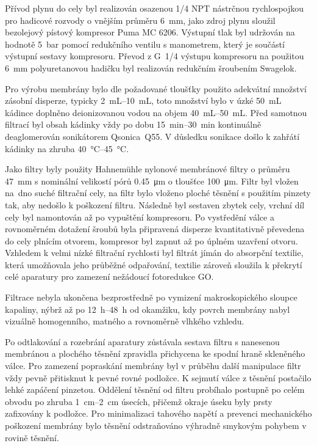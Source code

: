 Přívod plynu do cely byl realizován osazenou \qty[parse-numbers = false]{1/4}{\inchp} NPT nástrčnou rychlospojkou pro hadicové rozvody o vnějším průměru \qty{6}{\milli\meter}, jako zdroj plynu sloužil bezolejový pístový kompresor Puma MC 6206. Výstupní tlak byl udržován na hodnotě \qty{5}{\bar} pomocí redukčního ventilu s manometrem, který je součástí výstupní sestavy kompresoru. Převod z G~\qty[parse-numbers = false]{1/4}{\inchp} výstupu kompresoru na použitou \qty{6}{\milli\meter} polyuretanovou hadičku byl realizován redukčním šroubením Swagelok.

Pro výrobu membrány bylo dle požadované tloušťky použito adekvátní množství zásobní disperze, typicky \qtyrange{2}{10}{\milli\liter}, toto množství bylo v úzké \qty{50}{\milli\liter} kádince doplněno deionizovanou vodou na objem \qtyrange{40}{50}{\milli\liter}. Před samotnou filtrací byl obsah kádinky vždy po dobu \qtyrange{15}{30}{\minute} kontinuálně deaglomerován sonikátorem Qsonica~Q55. V důsledku sonikace došlo k zahřátí kádinky na zhruba \qtyrange{40}{45}{\celsius}.

Jako filtry byly použity Hahnemühle nylonové membránové filtry o průměru \qty{47}{\milli\meter} s nominální velikostí pórů \qty{0.45}{\micro\meter} o tloušťce \qty{100}{\micro\meter}. Filtr byl vložen na~dno suché filtrační cely, na filtr bylo vloženo ploché těsnění s použitím pinzety tak, aby nedošlo k poškození filtru. Následně byl sestaven zbytek cely, vrchní díl cely byl namontován až po vypuštění kompresoru. Po vystředění válce a rovnoměrném dotažení šroubů byla připravená disperze kvantitativně převedena do cely plnícím otvorem, kompresor byl zapnut až po úplném uzavření otvoru. Vzhledem k velmi nízké filtrační rychlosti byl filtrát jímán do absorpční textilie, která umožňovala jeho průběžné odpařování, textilie zároveň sloužila k překrytí celé aparatury pro zamezení nežádoucí fotoredukce GO. 

Filtrace nebyla ukončena bezprostředně po vymizení makroskopického sloupce kapaliny, nýbrž až po \qtyrange{12}{48}{\hour} od okamžiku, kdy povrch membrány nabyl vizuálně homogenního, matného a rovnoměrně vlhkého vzhledu.

Po odtlakování a rozebrání aparatury zůstávala sestava filtru s nanesenou membránou a plochého těsnění zpravidla přichycena ke spodní hraně skleněného válce. Pro zamezení popraskání membrány byl v průběhu další manipulace filtr vždy pevně přitisknut k pevné rovné podložce. K sejmutí válce z těsnění postačilo lehké zapáčení pinzetou. Oddělení těsnění od filtru probíhalo postupně po celém obvodu po zhruba \qtyrange{1}{2}{\centi\meter} úsecích, přičemž okraje úseku byly prsty zafixovány k podložce. Pro minimalizaci tahového napětí a prevenci mechanického poškození membrány bylo těsnění odstraňováno výhradně smykovým pohybem v rovině těsnění. 

